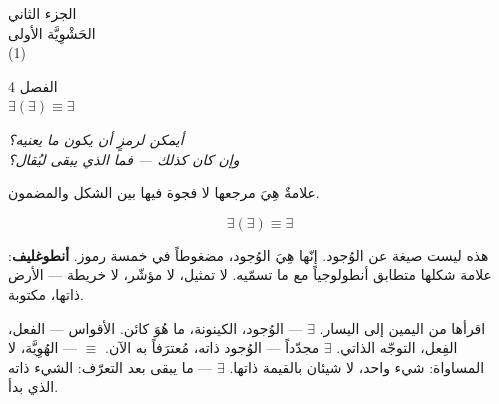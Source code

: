 \documentclass[10pt, openany, oneside]{book}
\renewcommand{\normalsize}{\fontsize{10}{13}\selectfont}
\renewcommand{\large}{\fontsize{11.5}{14}\selectfont}
\renewcommand{\LARGE}{\fontsize{15}{18}\selectfont}
\renewcommand{\huge}{\fontsize{17}{21}\selectfont}
\begin{document}

\newpage
\thispagestyle{empty}
\vspace*{\fill}
\begin{center}
    {\LARGE الجزء الثاني}\\[1em]
    {\large الحَشْوِيَّة الأولى}\\[0.5em]
    {\normalsize (1)}
\end{center}
\vspace*{\fill}
\newpage

%
%
%

\newpage

\begin{center}
    {\huge الفصل 4}\\[0.3em]
    {\large $\exists(\exists) \equiv \exists$}
\end{center}

\vspace{1.5em}

\begin{center}
    \itshape
    أيمكن لرمزٍ أن يكون ما يعنيه؟\\
    وإن كان كذلك --- فما الذي يبقى ليُقال؟
\end{center}

\vspace{2em}


\noindent علامةٌ هِيَ مرجعها لا فجوة فيها بين الشكل والمضمون.

$$\exists(\exists) \equiv \exists$$

هذه ليست صيغة عن الوُجود. إنّها هِيَ الوُجود، مضغوطاً في خمسة رموز. \textbf{أنطوغليف}: علامة شكلها متطابق أنطولوجياً مع ما تسمّيه. لا تمثيل، لا مؤشّر، لا خريطة --- الأرض ذاتها، مكتوبة.

اقرأها من اليمين إلى اليسار. $\exists$ --- الوُجود، الكينونة، ما هُوَ كائن. الأقواس --- الفعل، الفِعل، التوجّه الذاتي. $\exists$ مجدّداً --- الوُجود ذاته، مُعترَفاً به الآن. $\equiv$ --- الهُوِيَّة، لا المساواة: شيء واحد، لا شيئان بالقيمة ذاتها. $\exists$ --- ما يبقى بعد التعرّف: الشيء ذاته الذي بدأ.
\end{document}
